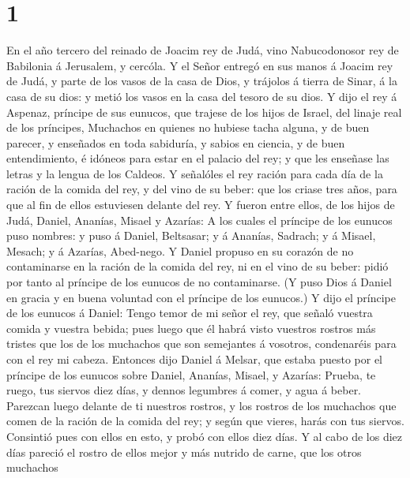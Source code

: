 \hypertarget{section}{%
\section{1}\label{section}}

 En el año tercero del reinado de Joacim rey de Judá, vino
Nabucodonosor rey de Babilonia á Jerusalem, y cercóla.  Y
el Señor entregó en sus manos á Joacim rey de Judá, y parte de los vasos
de la casa de Dios, y trájolos á tierra de Sinar, á la casa de su dios:
y metió los vasos en la casa del tesoro de su dios.  Y
dijo el rey á Aspenaz, príncipe de sus eunucos, que trajese de los hijos
de Israel, del linaje real de los príncipes,  Muchachos en
quienes no hubiese tacha alguna, y de buen parecer, y enseñados en toda
sabiduría, y sabios en ciencia, y de buen entendimiento, é idóneos para
estar en el palacio del rey; y que les enseñase las letras y la lengua
de los Caldeos.  Y señalóles el rey ración para cada día
de la ración de la comida del rey, y del vino de su beber: que los
criase tres años, para que al fin de ellos estuviesen delante del rey.
 Y fueron entre ellos, de los hijos de Judá, Daniel,
Ananías, Misael y Azarías:  A los cuales el príncipe de
los eunucos puso nombres: y puso á Daniel, Beltsasar; y á Ananías,
Sadrach; y á Misael, Mesach; y á Azarías, Abed-nego.  Y
Daniel propuso en su corazón de no contaminarse en la ración de la
comida del rey, ni en el vino de su beber: pidió por tanto al príncipe
de los eunucos de no contaminarse.  (Y puso Dios á Daniel
en gracia y en buena voluntad con el príncipe de los eunucos.)
 Y dijo el príncipe de los eunucos á Daniel: Tengo temor
de mi señor el rey, que señaló vuestra comida y vuestra bebida; pues
luego que él habrá visto vuestros rostros más tristes que los de los
muchachos que son semejantes á vosotros, condenaréis para con el rey mi
cabeza.  Entonces dijo Daniel á Melsar, que estaba puesto
por el príncipe de los eunucos sobre Daniel, Ananías, Misael, y Azarías:
 Prueba, te ruego, tus siervos diez días, y dennos
legumbres á comer, y agua á beber.  Parezcan luego
delante de ti nuestros rostros, y los rostros de los muchachos que comen
de la ración de la comida del rey; y según que vieres, harás con tus
siervos.  Consintió pues con ellos en esto, y probó con
ellos diez días.  Y al cabo de los diez días pareció el
rostro de ellos mejor y más nutrido de carne, que los otros muchachos
